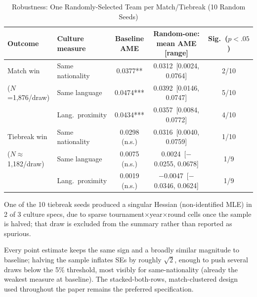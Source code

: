 \documentclass[10pt]{article}
\begin{document}
\begin{table}[htbp]
\color{blue}
\centering
\caption{Robustness: One Randomly-Selected Team per Match/Tiebreak (10 Random Seeds) \label{tab:ta5}}
\begin{threeparttable}
\begin{tabular}{llccc}
\toprule
Outcome & Culture measure & Baseline AME & Random-one: mean AME [range] & Sig.\ ($p<.05$) \\
\midrule
Match win & Same nationality & 0.0377** & 0.0312~[0.0024, 0.0764] & 2/10 \\
($N$=1,876/draw) & Same language & 0.0474*** & 0.0392~[0.0146, 0.0747] & 5/10 \\
 & Lang.\ proximity & 0.0434*** & 0.0357~[0.0084, 0.0772] & 4/10 \\
\midrule
Tiebreak win & Same nationality & 0.0298 (n.s.) & 0.0316~[0.0040, 0.0759] & 1/10 \\
($N\approx$1,182/draw) & Same language & 0.0075 (n.s.) & 0.0024~[$-$0.0255, 0.0678] & 1/9\tnote{a} \\
 & Lang.\ proximity & 0.0019 (n.s.) & $-$0.0047~[$-$0.0346, 0.0624] & 1/9\tnote{a} \\
\bottomrule
\end{tabular}
\begin{tablenotes}
\small
\item[a] One of the 10 tiebreak seeds produced a singular Hessian (non-identified MLE) in 2 of 3 culture specs, due to sparse tournament$\times$year$\times$round cells once the sample is halved; that draw is excluded from the summary rather than reported as spurious.
\item Every point estimate keeps the same sign and a broadly similar magnitude to baseline; halving the sample inflates SEs by roughly $\sqrt{2}$, enough to push several draws below the 5\% threshold, most visibly for same-nationality (already the weakest measure at baseline). The stacked-both-rows, match-clustered design used throughout the paper remains the preferred specification.
\end{tablenotes}
\end{threeparttable}
\end{table}
\FloatBarrier



\end{document}
